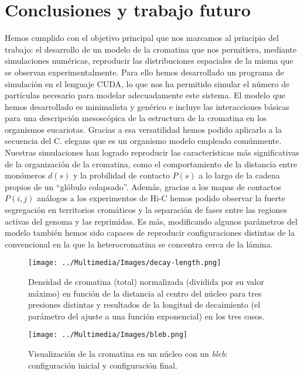 \chapter{Conclusiones y trabajo futuro}
\label{cap:conclusions}

Hemos cumplido con el objetivo principal que nos marcamos al principio del trabajo: el desarrollo de un modelo de la cromatina que nos permitiera, mediante simulaciones numéricas, reproducir las distribuciones espaciales de la misma que se observan experimentalmente. Para ello hemos desarrollado un programa de simulación en el lenguaje CUDA, lo que nos ha permitido simular el número de partículas necesario para modelar adecuadamente este sistema. El modelo que hemos desarrollado es minimalista y genérico e incluye las interacciones básicas para una descripción mesoscópica de la estructura de la cromatina en los organismos eucariotas. Gracias a esa versatilidad hemos podido aplicarlo a la secuencia del C. elegans que es un organismo modelo empleado comúnmente. Nuestras simulaciones han logrado reproducir las características más significativas de la organización de la cromatina, como el comportamiento de la distancia entre monómeros $d(s)$ y la probilidad de contacto $P(s)$ a lo largo de la cadena propios de un ``glóbulo colapsado''. Además, gracias a los mapas de contactos $P(i,j)$ análogos a los experimentos de Hi-C hemos podido observar la fuerte segregación en territorios cromáticos y la separación de fases entre las regiones activas del genoma y las reprimidas. Es más, modificando algunos parámetros del modelo también hemos sido capaces de reproducir configuraciones distintas de la convencional en la que la heterocromatina se concentra cerca de la lámina.

\begin{figure}[p]
    \centering
    \texttt{[image: ../Multimedia/Images/decay-length.png]}
    \caption{Densidad de cromatina (total) normalizada (dividida por su valor máximo) en función de la distancia al centro del núcleo para tres presiones distintas y resultados de la longitud de decaimiento (el parámetro del ajuste a una función exponencial) en los tres casos.}
    \label{fig:exp-fit}
\end{figure}

\begin{figure}[p]
    \centering
    \texttt{[image: ../Multimedia/Images/bleb.png]}
    \caption{Visualización de la cromatina en un núcleo con un \textit{bleb}: configuración inicial y configuración final.}
    \label{fig:bleb}
\end{figure}

